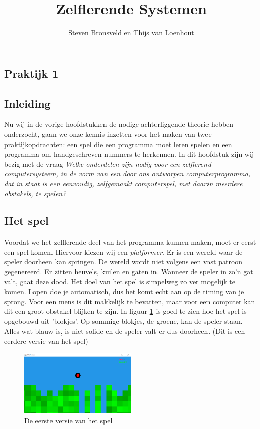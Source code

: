 \documentclass[a4paper,titlepage]{article}
\title{Zelflerende Systemen}
\author{Steven Bronsveld en Thijs van Loenhout}
\begin{document}
\textcolor{praktijk}{
	\section{Praktijk 1}
}


\subsection{Inleiding}
Nu wij in de vorige hoofdstukken de nodige achterliggende theorie hebben onderzocht, gaan we onze kennis inzetten voor het maken van twee praktijkopdrachten: een spel die een programma moet leren spelen en een programma om handgeschreven nummers te herkennen. In dit hoofdstuk zijn wij bezig met de vraag \textit{Welke onderdelen zijn nodig voor een zelflerend computersysteem, in de vorm van een door ons ontworpen computerprogramma, dat in staat is een eenvoudig, zelfgemaakt computerspel, met daarin meerdere obstakels, te spelen?}

\subsection{Het spel}
Voordat we het zelflerende deel van het programma kunnen maken, moet er eerst een spel komen. Hiervoor kiezen wij een \textit{platformer}. Er is een wereld waar de speler doorheen kan springen. De wereld wordt niet volgens een vast patroon gegenereerd. Er zitten heuvels, kuilen en gaten in. Wanneer de speler in zo'n gat valt, gaat deze dood. Het doel van het spel is simpelweg zo ver mogelijk te komen. Lopen doe je automatisch, dus het komt echt aan op de timing van je sprong. Voor een mens is dit makkelijk te bevatten, maar voor een computer kan dit een groot obstakel blijken te zijn.
In figuur \ref{fig:platformer1} is goed te zien hoe het spel is opgebouwd uit 'blokjes'. Op sommige blokjes, de groene, kan de speler staan. Alles wat blauw is, is niet solide en de speler valt er dus doorheen. (Dit is een eerdere versie van het spel)

\begin{figure}[h]
  \centering
    \includegraphics[width=0.5\textwidth]{platformer1.png}
  \caption{De eerste versie van het spel}
  \label{fig:platformer1}
\end{figure}
\end{document}
